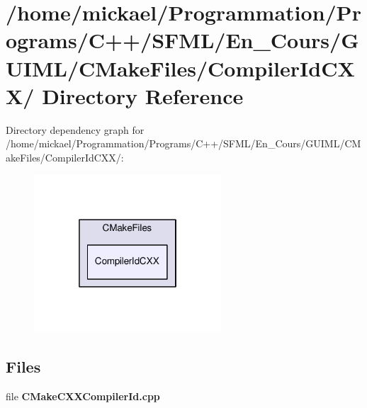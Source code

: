 \section{/home/mickael/\-Programmation/\-Programs/\-C++/\-S\-F\-M\-L/\-En\-\_\-\-Cours/\-G\-U\-I\-M\-L/\-C\-Make\-Files/\-Compiler\-Id\-C\-X\-X/ Directory Reference}
\label{dir_ce08be8233f8a70d54d8cd9d95bbe4ba}
Directory dependency graph for /home/mickael/\-Programmation/\-Programs/\-C++/\-S\-F\-M\-L/\-En\-\_\-\-Cours/\-G\-U\-I\-M\-L/\-C\-Make\-Files/\-Compiler\-Id\-C\-X\-X/\-:\nopagebreak
\begin{figure}[H]
\begin{center}
\leavevmode
\includegraphics[width=198pt]{dir_ce08be8233f8a70d54d8cd9d95bbe4ba_dep}
\end{center}
\end{figure}
\subsection*{Files}
\begin{DoxyCompactItemize}
\item 
file {\bfseries C\-Make\-C\-X\-X\-Compiler\-Id.\-cpp}
\end{DoxyCompactItemize}
